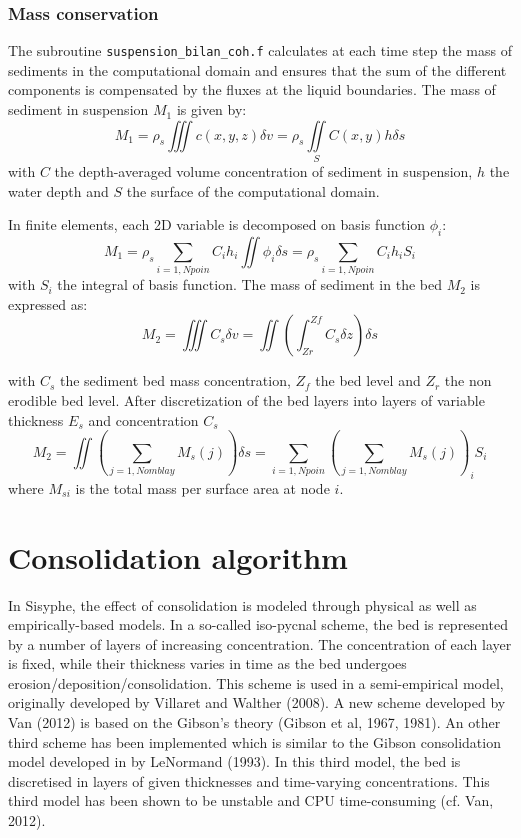 \medskip


\subsubsection{Mass conservation }

The subroutine \texttt{suspension\_bilan\_coh.f} calculates at each time step the mass
of sediments in the computational domain and ensures that the sum of the
different components is compensated by the fluxes at the liquid boundaries. The mass of sediment in suspension $M_1$ is given by:
\begin{equation*}
M_1 = \rho_s \iiint c(x,y,z) \delta v = \rho_s\iint\limits_S C(x,y) h\delta s 
\end{equation*}
with $C$ the depth-averaged volume concentration of sediment in suspension, $h$ the water depth and $S$ the surface of the computational domain.

In finite elements, each 2D variable is decomposed on basis function $\phi_i$:
\begin{equation*}
M_1 = \rho_s \sum_{i=1,Npoin} C_i h_i \iint \phi_i \delta s= \rho_s \sum_{i=1,Npoin} C_i h_i S_i 
\end{equation*}
with $S_i$ the integral of basis function. The mass of sediment in the bed $M_2$ is expressed as:
\begin{equation*}
M_2 = \iiint C_s \delta v = \iint\left(\int_{Zr}^{Zf} C_s \delta z \right)\delta s 
\end{equation*}

with $C_s$ the sediment bed mass concentration, $Z_f$ the bed level and $Z_r$ the non erodible bed level.
After discretization of the bed layers into layers of variable thickness $E_s$ and concentration $C_s$
\begin{equation*}
M_2 =\iint \left(\sum\limits_{j=1,Nomblay} M_s(j)\right) \delta s = 
\sum_{i=1,Npoin}\left(\sum_{j=1,Nomblay} M_s(j)\right)_i S_i 
\end{equation*}
where $M_{si}$ is the total mass per surface area at node $i$.


\section{Consolidation algorithm}

In Sisyphe, the effect of consolidation is modeled through physical as well as empirically-based models.
In a so-called iso-pycnal scheme, the bed is represented by a number of layers of increasing
concentration. The concentration of each layer is fixed, while their
thickness varies in time as the bed undergoes erosion/deposition/consolidation. This scheme is used in a semi-empirical
model, originally developed by Villaret and Walther (2008). A new scheme
developed by Van (2012) is based on the Gibson's theory (Gibson et
al, 1967, 1981). An other third scheme has been implemented which is similar
to the Gibson consolidation model developed in \telddd by LeNormand (1993).
In this third model, the bed is discretised in layers of given thicknesses
and time-varying concentrations. This third model has been shown to be
unstable and CPU time-consuming (cf. Van, 2012). 
